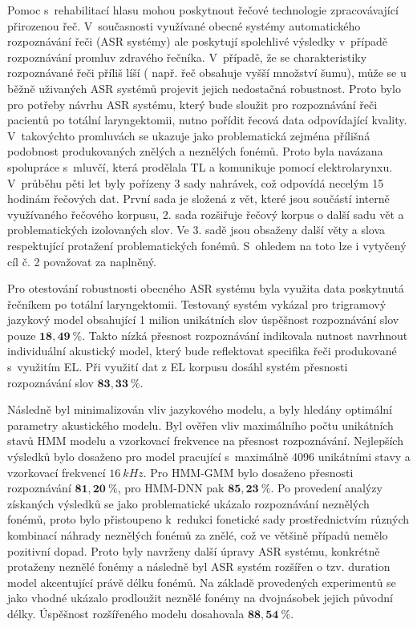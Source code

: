 Pomoc s~rehabilitací hlasu mohou poskytnout řečové technologie zpracovávající přirozenou řeč. V~současnosti využívané obecné systémy automatického rozpoznávání řeči (ASR systémy) ale poskytují spolehlivé výsledky v~případě rozpoznávání promluv zdravého řečníka. V~případě, že se charakteristiky rozpoznávané řeči příliš líší ( např. řeč obsahuje vyšší množství šumu), může se u běžně uživaných ASR systémů projevit jejich nedostačná robustnost. Proto bylo pro potřeby návrhu ASR systému, který bude sloužit pro rozpoznávání řeči pacientů po totální laryngektomii, nutno pořídit řecová data odpovídající kvality. V~takovýchto promluvách se ukazuje jako problematická zejména přílišná podobnost produkovaných znělých a neznělých fonémů. Proto byla navázana spolupráce s~mluvčí, která prodělala TL a komunikuje pomocí elektrolarynxu. V~průběhu pěti let byly pořízeny 3 sady nahrávek, což odpovídá necelým 15 hodinám řečových dat. První sada je složená z vět, které jsou součástí interně využívaného řečového korpusu, 2. sada rozšiřuje řečový korpus o další sadu vět a problematických izolovaných slov. Ve 3. sadě jsou obsaženy další věty a slova respektující protažení problematických fonémů.
S~ohledem na toto lze i vytyčený cíl č. 2 považovat za naplněný.

Pro otestování robustnosti obecného ASR systému byla využita data poskytnutá řečníkem po totální laryngektomii. Testovaný systém vykázal pro trigramový jazykový model obsahující 1 milion unikátních slov úspěšnost rozpoznávání slov pouze $\boldsymbol{18,49~\%}$. Takto nízká přesnost rozpoznávání indikovala nutnost navrhnout individuální akustický model, který bude reflektovat specifika řeči produkované s~využitím EL. Při využití dat z EL korpusu dosáhl systém přesnosti rozpoznávání slov $\boldsymbol{83,33~\%}$.

Následně byl minimalizován vliv jazykového modelu,
a byly hledány optimální parametry akustického modelu. Byl ověřen vliv maximálního počtu unikátních stavů HMM modelu a vzorkovací frekvence na přesnost rozpoznávání. Nejlepších výsledků bylo dosaženo pro model pracující s~maximálně 4096 unikátními stavy a vzorkovací frekvencí $16\ kHz$. Pro HMM-GMM bylo dosaženo přesnosti rozpoznávání $\boldsymbol{81,20~\%}$, pro HMM-DNN pak $\boldsymbol{85,23~\%}$. Po provedení analýzy získaných výsledků se jako problematické ukázalo rozpoznávání neznělých fonémů, proto bylo přistoupeno  k~redukci fonetické sady prostřednictvím různých kombinací náhrady neznělých fonémů za znělé, což ve většině případů nemělo pozitivní dopad. Proto byly navrženy další úpravy ASR systému, konkrétně protaženy neznělé fonémy a následně byl ASR systém rozšířen o tzv. duration model akcentující právě délku fonémů. Na základě provedených experimentů se jako vhodné ukázalo prodloužit neznělé fonémy na dvojnásobek jejich původní délky. Úspěšnost rozšířeného modelu dosahovala $\boldsymbol{88,54~\%}$.

